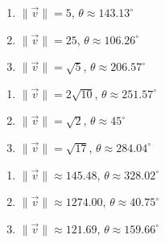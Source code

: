 \documentclass{ximera}
\begin{document}
\begin{multicols}{3}

\begin{enumerate}

\setcounter{enumi}{\value{HW}}

\item $\|\vec{v}\| = 5$, $\theta \approx 143.13^{\circ}$
\item $\|\vec{v}\| = 25$, $\theta \approx 106.26^{\circ}$
\item $\|\vec{v}\| = \sqrt{5}$, $\theta \approx 206.57^{\circ}$

\setcounter{HW}{\value{enumi}}

\end{enumerate}

\end{multicols}

\begin{multicols}{3}

\begin{enumerate}

\setcounter{enumi}{\value{HW}}

\item  $\|\vec{v}\| = 2\sqrt{10}$, $\theta \approx 251.57^{\circ}$
\item  $\|\vec{v}\| = \sqrt{2}$, $\theta \approx 45^{\circ}$
\item $\|\vec{v}\| = \sqrt{17}$, $\theta \approx 284.04^{\circ}$

\setcounter{HW}{\value{enumi}}

\end{enumerate}

\end{multicols}

\begin{multicols}{3}

\begin{enumerate}

\setcounter{enumi}{\value{HW}}

\item \small $\|\vec{v}\| \approx 145.48$, $\theta \approx 328.02^{\circ}$ \normalsize
\item \small $\|\vec{v}\| \approx 1274.00$, $\theta \approx 40.75^{\circ}$ \normalsize
\item \small $\|\vec{v}\| \approx 121.69$, $\theta \approx 159.66^{\circ}$ \normalsize

\setcounter{HW}{\value{enumi}}

\end{enumerate}

\end{multicols}
\end{document}

